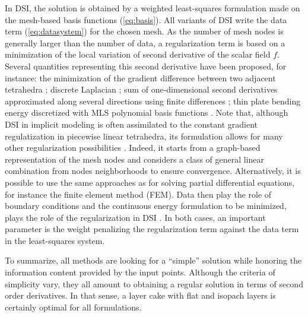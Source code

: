 \documentclass[final]{ring20}
\begin{document}
{In DSI, the solution is obtained by a weighted least-squares formulation made on the mesh-based basis functions (\ref{eq:basis}). All variants of DSI write the data term (\ref{eq:datasystem}) for the chosen mesh. As the number of mesh nodes is generally larger than the number of data, a regularization term is based on a minimization of the local variation of second derivative of the scalar field $f$. Several quantities representing this second derivative have been proposed, for instance: the minimization of the gradient difference between two adjacent tetrahedra \citep{Frank2007CG}; discrete Laplacian \citep{Irakarama2018EAGE}; sum of one-dimensional second derivatives approximated along several directions using finite differences \citep{Irakarama2018EAGE}; thin plate bending energy discretized with MLS polynomial basis functions \citep{Renaudeau2019MG}. Note that, although DSI in implicit modeling is often assimilated to the constant gradient regulatization in piecewise linear tetrahedra, its formulation allows for many other regularization possibilities \citep{Mallet1992CD}. Indeed, it starts from a graph-based representation of the mesh nodes and considers a class of general linear combination from nodes neighborhoods to ensure convergence. Alternatively, it is possible to use the same approaches as for solving partial differential equations, for instance the finite element method (FEM). Data then play the role of boundary conditions and the continuous energy formulation to be minimized, plays the role of the regularization in DSI \citep{Renaudeau2019MG}. In both cases, an important parameter is the weight penalizing the regularization term against the data term in the least-squares system. 

To summarize, all methods are looking for a ``simple'' solution while honoring the information content provided by the input points. Although the criteria of simplicity vary, they all amount to obtaining a regular solution in terms of second order derivatives. In that sense, a layer cake with flat and isopach layers is certainly optimal for all formulations. 

}
\end{document}
